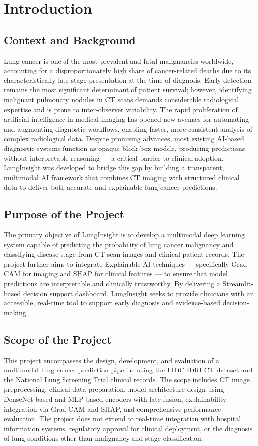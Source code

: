 \chapter{Introduction}\thispagestyle{empty}
\graphicspath{{Chapter1/figures/}}
{

\section{Context and Background}
Lung cancer is one of the most prevalent and fatal malignancies worldwide, accounting for a disproportionately high share of cancer-related deaths due to its characteristically late-stage presentation at the time of diagnosis. Early detection remains the most significant determinant of patient survival; however, identifying malignant pulmonary nodules in CT scans demands considerable radiological expertise and is prone to inter-observer variability. The rapid proliferation of artificial intelligence in medical imaging has opened new avenues for automating and augmenting diagnostic workflows, enabling faster, more consistent analysis of complex radiological data. Despite promising advances, most existing AI-based diagnostic systems function as opaque black-box models, producing predictions without interpretable reasoning — a critical barrier to clinical adoption. LungInsight was developed to bridge this gap by building a transparent, multimodal AI framework that combines CT imaging with structured clinical data to deliver both accurate and explainable lung cancer predictions.

\section{Purpose of the Project}
The primary objective of LungInsight is to develop a multimodal deep learning system capable of predicting the probability of lung cancer malignancy and classifying disease stage from CT scan images and clinical patient records. The project further aims to integrate Explainable AI techniques — specifically Grad-CAM for imaging and SHAP for clinical features — to ensure that model predictions are interpretable and clinically trustworthy. By delivering a Streamlit-based decision support dashboard, LungInsight seeks to provide clinicians with an accessible, real-time tool to support early diagnosis and evidence-based decision-making.

\section{Scope of the Project}
This project encompasses the design, development, and evaluation of a multimodal lung cancer prediction pipeline using the LIDC-IDRI CT dataset and the National Lung Screening Trial clinical records. The scope includes CT image preprocessing, clinical data preparation, model architecture design using DenseNet-based and MLP-based encoders with late fusion, explainability integration via Grad-CAM and SHAP, and comprehensive performance evaluation. The project does not extend to real-time integration with hospital information systems, regulatory approval for clinical deployment, or the diagnosis of lung conditions other than malignancy and stage classification.

}
